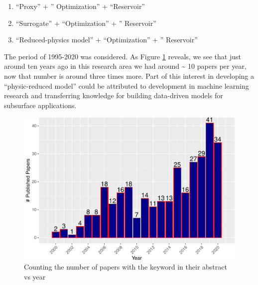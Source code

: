 \documentclass[]{elsarticle} %
\providecommand{\tightlist}{%
  \setlength{\itemsep}{0pt}\setlength{\parskip}{0pt}}
\begin{document}
\begin{enumerate}
\def\labelenumi{\arabic{enumi}.}
\tightlist
\item
  ``Proxy'' + '' Optimization'' + ``Reservoir''
\item
  ``Surrogate'' + ``Optimization'' + '' Reservoir''
\item
  ``Reduced-physics model'' + ``Optimization'' + '' Reservoir''
\end{enumerate}

The period of 1995-2020 was considered. As Figure \ref{fig:onepetroanalysis} reveals, we see that just around ten years ago in this research area we had around \textasciitilde{} 10 papers per year, now that number is around three times more. Part of this interest in developing a ``physic-reduced model'' could be attributed to development in machine learning research and transferring knowledge for building data-driven models for subsurface applications.

\begin{figure}

{\centering \includegraphics[width=468px]{0_Paper1_main_files/figure-latex/onepetroanalysis-1} 

}

\caption{Counting the number of papers with the keyword in their abstract vs year}\label{fig:onepetroanalysis}
\end{figure}
\end{document}
